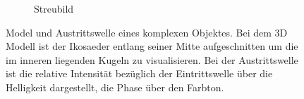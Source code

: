 \begin{figure}
\begin{subfigure}[b]{0.49\textwidth}
		\caption{Streubild}
		\label{fig:komplexexit}
	\end{subfigure}
	\caption[Model und Austrittswelle eines komplexen Objektes]{Model und Austrittswelle eines komplexen Objektes. Bei dem 3D Modell ist der Ikosaeder entlang seiner Mitte aufgeschnitten um die im inneren liegenden Kugeln zu visualisieren. Bei der Austrittswelle ist die relative Intensität bezüglich der Eintrittswelle über die Helligkeit dargestellt, die Phase über den Farbton.}
	\label{fig:komplex}
\end{figure}
